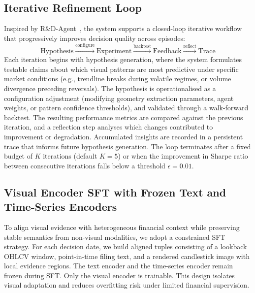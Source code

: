 \subsection{Iterative Refinement Loop}
\label{sec:loop}

Inspired by R\&D-Agent~\cite{rdagent2025}, the system supports a closed-loop iterative workflow that progressively improves decision quality across episodes:
\begin{equation}
    \text{Hypothesis} \xrightarrow{\text{configure}} \text{Experiment} \xrightarrow{\text{backtest}} \text{Feedback} \xrightarrow{\text{reflect}} \text{Trace}
\end{equation}
Each iteration begins with hypothesis generation, where the system formulates testable claims about which visual patterns are most predictive under specific market conditions (e.g., trendline breaks during volatile regimes, or volume divergence preceding reversals). The hypothesis is operationalised as a configuration adjustment (modifying geometry extraction parameters, agent weights, or pattern confidence thresholds), and validated through a walk-forward backtest. The resulting performance metrics are compared against the previous iteration, and a reflection step analyses which changes contributed to improvement or degradation. Accumulated insights are recorded in a persistent trace that informs future hypothesis generation. The loop terminates after a fixed budget of $K$ iterations (default $K{=}5$) or when the improvement in Sharpe ratio between consecutive iterations falls below a threshold $\epsilon{=}0.01$.



\subsection{Visual Encoder SFT with Frozen Text and Time-Series Encoders}
\label{sec:visual_sft}

To align visual evidence with heterogeneous financial context while preserving stable semantics from non-visual modalities, we adopt a constrained SFT strategy. For each decision date, we build aligned tuples consisting of a lookback OHLCV window, point-in-time filing text, and a rendered candlestick image with local evidence regions. The text encoder and the time-series encoder remain frozen during SFT. Only the visual encoder is trainable. This design isolates visual adaptation and reduces overfitting risk under limited financial supervision.

